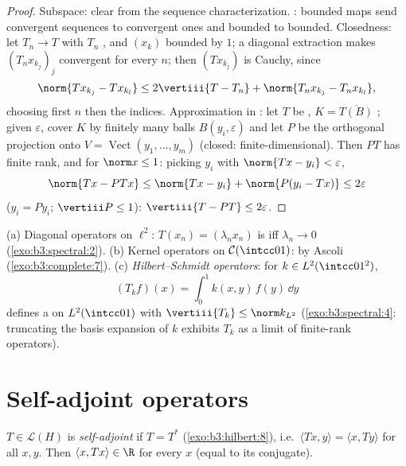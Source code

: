 \begin{proof}
Subspace: clear from the sequence characterization. :
bounded maps send convergent sequences to convergent ones and
bounded to bounded. Closedness: let $T_n \to T$ with $T_n$
, and $(x_k)$ bounded by $1$; a diagonal extraction
makes $(T_nx_{k_j})_j$ convergent for every $n$; then
$(Tx_{k_j})$ is Cauchy, since
\[
\norm{Tx_{k_j} - Tx_{k_l}} \leq 2\vertiii{T - T_n} +
\norm{T_nx_{k_j} - T_nx_{k_l}} ,
\]
choosing first $n$ then the indices. Approximation in : let $T$ be , $K = \overline{T(B)}$ ;
given $\varepsilon$, cover $K$ by finitely many balls
$B(y_i, \varepsilon)$ and let $P$ be the orthogonal projection
onto $V = \operatorname{Vect}(y_1, \dots, y_m)$ (closed:
finite-dimensional). Then $PT$ has finite rank, and for
$\norm x \leq 1$: picking $y_i$ with $\norm{Tx - y_i} <
\varepsilon$,
\[
\norm{Tx - PTx} \leq \norm{Tx - y_i} + \norm{P(y_i - Tx)}
\leq 2\varepsilon
\]
($y_i = Py_i$; $\vertiii P \leq 1$): $\vertiii{T - PT} \leq
2\varepsilon$.
\end{proof}

\begin{example}\label{ex:b3:spectral:examples}
(a) Diagonal operators on $\ell^2$: $T(x_n) = (\lambda_nx_n)$
is  iff $\lambda_n \to 0$
(\cref{exo:b3:spectral:2}).
(b) Kernel operators on $\mathcal C(\intcc01)$:  by
Ascoli (\cref{exo:b3:complete:7}).
(c) \emph{Hilbert--Schmidt operators}: for $k \in L^2(\intcc01^2)$,
\[
(T_kf)(x) = \int_0^1k(x, y)\,f(y)\,\dd y
\]
defines a  on $L^2(\intcc01)$ with
$\vertiii{T_k} \leq \norm k_{L^2}$
(\cref{exo:b3:spectral:4}: truncating the basis expansion of
$k$ exhibits $T_k$ as a limit of finite-rank operators).
\end{example}

\section{Self-adjoint operators}

\begin{definition}\label{def:b3:spectral:selfadjoint}
$T \in \mathcal L(H)$ is \emph{self-adjoint} if $T = T^*$ (\cref{exo:b3:hilbert:8}), i.e.\
$\langle Tx, y\rangle = \langle x, Ty\rangle$ for all $x, y$.
Then $\langle x, Tx\rangle \in \R$ for every $x$ (equal to its
conjugate).
\end{definition}

